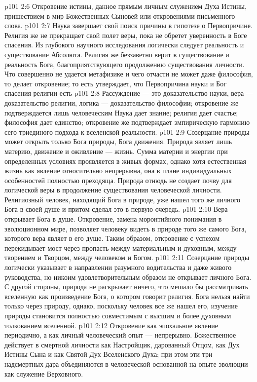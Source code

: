 \vs p101 2:6 \bibnobreakspace Откровение истины, данное прямым личным служением Духа Истины, пришествием в мир Божественных Сыновей или откровениями письменного слова.
\vs p101 2:7 \pc Наука завершает свой поиск причины в гипотезе о Первопричине. Религия же не прекращает свой полет веры, пока не обретет уверенность в Боге спасения. Из глубокого научного исследования логически следует реальность и существование Абсолюта. Религия же беззаветно верит в существование и реальность Бога, благоприятствующего продолжению существования личности. Что совершенно не удается метафизике и чего отчасти не может даже философия, то делает откровение; то есть утверждает, что Первопричина науки и Бог спасения религии есть 
\vs p101 2:8 \pc Рассуждение --- это доказательство науки, вера --- доказательство религии, логика --- доказательство философии; откровение же подтверждается лишь человеческим  Наука дает знание; религия дает счастье; философия дает единство; откровение же подтверждает эмпирическую гармонию сего триединого подхода к вселенской реальности.
\vs p101 2:9 Созерцание природы может открыть только Бога природы, Бога движения. Природа являет лишь материю, движение и оживление --- жизнь. Сумма материи и энергии при определенных условиях проявляется в живых формах, однако хотя естественная жизнь как явление относительно непрерывна, она в плане индивидуальных особенностей полностью преходяща. Природа отнюдь не создает почву для логической веры в продолжение существования человеческой личности. Религиозный человек, находящий Бога в природе, уже нашел того же личного Бога в своей душе и притом сделал это в первую очередь.
\vs p101 2:10 \pc Вера открывает Бога в душе. Откровение, замена моронтийного понимания в эволюционном мире, позволяет человеку видеть в природе того же самого Бога, которого вера являет в его душе. Таким образом, откровение с успехом перекидывает мост через пропасть между материальным и духовным, между творением и Творцом, между человеком и Богом.
\vs p101 2:11 Созерцание природы логически указывает в направлении разумного водительства и даже живого руководства, но никоим удовлетворительным образом не открывает личного Бога. С другой стороны, природа не раскрывает ничего, что мешало бы рассматривать вселенную как произведение Бога, о котором говорит религия. Бога нельзя найти только через природу, однако, поскольку человек все же нашел его, изучение природы становится полностью совместимым с высшим и более духовным толкованием вселенной.
\vs p101 2:12 \pc Откровение как эпохальное явление периодично, а как личный человеческий опыт --- непрерывно. Божественное действует в смертной личности как Настройщик, дарованный Отцом, как Дух Истины Сына и как Святой Дух Вселенского Духа; при этом эти три надсмертных дара объединяются в человеческой основанной на опыте эволюции как служение Верховного.
